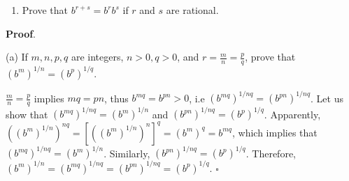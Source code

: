 \documentclass[10pt,varwidth=6in,margin=0.2in,preview]{standalone}
\begin{document}
\begin{flushleft}
\begin{enumerate}[label=(\alph*)]

\item
Prove that $b^{r+s} = b^r b^s$ if $r$ and $s$ are rational.

\end{enumerate}



\textbf{Proof}.

\vspace{0.1in}

(a) If $m, n, p, q$ are integers, $n > 0, q > 0$, and $r = \frac{m}{n} = \frac{p}{q}$, prove that $(b^m)^{1/n} = (b^p)^{1/q}$.


\vspace{0.1in}

$\frac{m}{n} = \frac{p}{q}$ implies $mq = pn$, thus $b^{mq} = b^{pn} > 0$, i.e $(b^{mq})^{1/nq} = (b^{pn})^{1/nq}$.
Let us show that $(b^{mq})^{1/nq} = (b^m)^{1/n}$ and $(b^{pn})^{1/nq} = (b^p)^{1/q}$.
Apparently, $\left( (b^m)^{1/n} \right)^{nq} = \left[ \left( (b^m)^{1/n} \right)^n \right]^q = (b^m)^q = b^{mq}$, which implies that $(b^{mq})^{1/nq} = (b^m)^{1/n}$.
Similarly, $(b^{pn})^{1/nq} = (b^p)^{1/q}$.
Therefore, $(b^m)^{1/n} = (b^{mq})^{1/nq} = (b^{pn})^{1/nq} = (b^p)^{1/q}$. $\square$


\end{flushleft}
\end{document}
